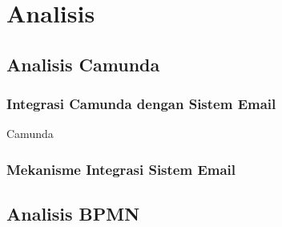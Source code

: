 \chapter{Analisis}
\label{chap:analisis}

\section{Analisis Camunda}
\label{sec:analisiscamunda}

\subsection{Integrasi Camunda dengan Sistem Email}
\label{sec:integrasicamunda}
Camunda


\subsection{Mekanisme Integrasi Sistem Email}


\section{Analisis BPMN}
\label{sec:analisisbpmn}